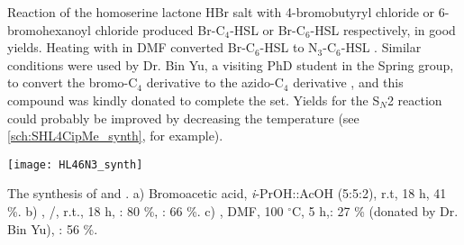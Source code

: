 Reaction of the homoserine lactone HBr salt  with 4-bromobutyryl chloride  or 6-bromohexanoyl chloride  produced Br-C$_4$-HSL  or Br-C$_6$-HSL  respectively, in good yields. Heating with  in DMF converted Br-C$_6$-HSL  to N$_3$-C$_6$-HSL . 
Similar conditions were used by Dr. Bin Yu, a visiting PhD student in the Spring group, to convert the bromo-C$_4$ derivative  to the azido-C$_4$ derivative , and this compound was kindly donated to complete the set. 
Yields for the S$_N$2 reaction could probably be improved by decreasing the temperature (see \ref{sch:SHL4CipMe_synth}, for example).

\begin{scheme}[H]
	\begin{center}
		\texttt{[image: HL46N3\_synth]}
		\caption{The synthesis of  and .
		a) Bromoacetic acid, \textit{i}-PrOH::AcOH (5:5:2), r.t, 18 h, 41 \%.
		b) , /, r.t., 18 h, : 80 \%, : 66 \%.
		c) , DMF, 100 $^{\circ}$C, 5 h,: 27 \% (donated by Dr. Bin Yu), : 56 \%.
		\label{sch:HL46N3_synth}}
	\end{center}
\end{scheme}